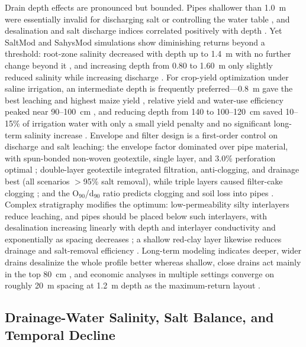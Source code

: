Drain depth effects are pronounced but bounded. Pipes shallower than 1.0~m were essentially invalid for discharging salt or controlling the water table \parencite{Qian2021b}, and desalination and salt discharge indices correlated positively with depth \parencite{Qian2021b,Tian2023c,Tian2024}. Yet SaltMod and SahysMod simulations show diminishing returns beyond a threshold: root-zone salinity decreased with depth up to 1.4~m with no further change beyond it \parencite{Bahçeci2007}, and increasing depth from 0.80 to 1.60~m only slightly reduced salinity while increasing discharge \parencite{Bahçeci2006}. For crop-yield optimization under saline irrigation, an intermediate depth is frequently preferred---0.8~m gave the best leaching and highest maize yield \parencite{Feng2017}, relative yield and water-use efficiency peaked near 90--100~cm \parencite{Feng2019}, and reducing depth from 140 to 100--120~cm saved 10--15\% of irrigation water with only a small yield penalty and no significant long-term salinity increase \parencite{Muhammad2021}. Envelope and filter design is a first-order control on discharge and salt leaching: the envelope factor dominated over pipe material, with spun-bonded non-woven geotextile, single layer, and 3.0\% perforation optimal \parencite{Li2022}; double-layer geotextile integrated filtration, anti-clogging, and drainage best (all scenarios $>$95\% salt removal), while triple layers caused filter-cake clogging \parencite{Wang2024d}; and the O$_{90}$/d$_{90}$ ratio predicts clogging and soil loss into pipes \parencite{Elzoghby2021}. Complex stratigraphy modifies the optimum: low-permeability silty interlayers reduce leaching, and pipes should be placed below such interlayers, with desalination increasing linearly with depth and interlayer conductivity and exponentially as spacing decreases \parencite{Guo2024b}; a shallow red-clay layer likewise reduces drainage and salt-removal efficiency \parencite{Tian2024}. Long-term modeling indicates deeper, wider drains desalinize the whole profile better whereas shallow, close drains act mainly in the top 80~cm \parencite{KAMRA1991}, and economic analyses in multiple settings converge on roughly 20~m spacing at 1.2~m depth as the maximum-return layout \parencite{Chen2025}.

\subsection{Drainage-Water Salinity, Salt Balance, and Temporal Decline}

